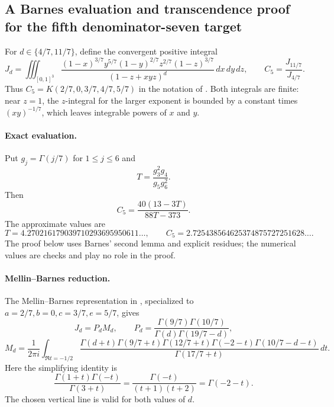 \documentclass[11pt,a4paper]{article}
\theoremstyle{definition}
\theoremstyle{remark}
\numberwithin{equation}{section}
\begin{document}
\subsection{A Barnes evaluation and transcendence proof for the fifth denominator-seven target}
\label{extra7-sec:target5}

For $d\in\{4/7,11/7\}$, define the convergent positive integral
\[
 J_d=\iiint_{[0,1]^3}
 \frac{(1-x)^{3/7}y^{5/7}(1-y)^{2/7}
 z^{2/7}(1-z)^{3/7}}
 {(1-z+xyz)^d}\,dx\,dy\,dz,
 \qquad C_5=\frac{J_{11/7}}{J_{4/7}}.
\]
Thus $C_5=K(2/7,0,3/7,4/7,5/7)$ in the notation of
\cite{extra8-zudilin}. Both integrals are finite: near $z=1$, the
$z$-integral for the larger exponent is bounded by a constant
times $(xy)^{-1/7}$, which leaves integrable powers of $x$ and $y$.

\paragraph{Exact evaluation.}
Put $g_j=\Gamma(j/7)$ for $1\leq j\leq6$ and
\[
 T=\frac{g_3^2g_4}{g_5g_6^2}.
\]
Then
\begin{equation}
 \boxed{C_5=\frac{40(13-3T)}{88T-373}.}
 \label{extra7-eq:target5-evaluation}
\end{equation}
The approximate values are
\[
 T=4.270216179039710293695950611\ldots,
 \qquad C_5=2.725438564625374875727251628\ldots.
\]
The proof below uses Barnes' second lemma and explicit residues;
the numerical values are checks and play no role in the proof.

\paragraph{Mellin--Barnes reduction.}
The Mellin--Barnes representation in \cite{extra8-zudilin}, specialized to
$a=2/7,b=0,c=3/7,e=5/7$, gives
\[
 J_d=P_dM_d,\qquad
 P_d=\frac{\Gamma(9/7)\Gamma(10/7)}
 {\Gamma(d)\Gamma(19/7-d)},
\]
\[
 M_d=\frac{1}{2\pi i}\int_{\Re t=-1/2}
 \frac{\Gamma(d+t)\Gamma(9/7+t)\Gamma(12/7+t)
 \Gamma(-2-t)\Gamma(10/7-d-t)}{\Gamma(17/7+t)}\,dt.
\]
Here the simplifying identity is
\[
 \frac{\Gamma(1+t)\Gamma(-t)}{\Gamma(3+t)}
 =\frac{\Gamma(-t)}{(t+1)(t+2)}=\Gamma(-2-t).
\]
The chosen vertical line is valid for both values of $d$.
\end{document}
